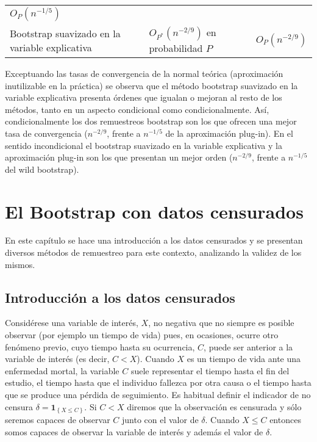 \documentclass[
]{book}
\theoremstyle{definition}
\theoremstyle{definition}
\theoremstyle{definition}
\theoremstyle{remark}
\begin{document}
\begin{longtable}[]{@{}lll@{}}
\begin{minipage}[t]{0.29\columnwidth}
\(O_{P}\left(n^{-1/5}\right)\)\strut
\end{minipage}\tabularnewline
\begin{minipage}[t]{0.25\columnwidth}\raggedright
Bootstrap suavizado
en la variable
explicativa\strut
\end{minipage} & \begin{minipage}[t]{0.37\columnwidth}\raggedright
\(O_{P^{\ast}}\left( n^{-2/9}\right)\)
en probabilidad \(P\)\strut
\end{minipage} & \begin{minipage}[t]{0.29\columnwidth}\raggedright
\(O_{P}\left(n^{-2/9}\right)\)\strut
\end{minipage}\tabularnewline
\bottomrule
\end{longtable}

Exceptuando las tasas de convergencia de la normal teórica (aproximación
inutilizable en la práctica) se observa que el método bootstrap
suavizado en la variable explicativa presenta órdenes que igualan o
mejoran al resto de los métodos, tanto en un aspecto condicional como
condicionalmente. Así, condicionalmente los dos remuestreos bootstrap
son los que ofrecen una mejor tasa de convergencia (\(n^{-2/9}\),
frente a \(n^{-1/5}\) de la aproximación plug-in). En el
sentido incondicional el bootstrap suavizado en la variable explicativa
y la aproximación plug-in son los que presentan un mejor orden
(\(n^{-2/9}\), frente a \(n^{-1/5}\) del wild bootstrap).

\hypertarget{cap8}{%
\chapter{El Bootstrap con datos censurados}\label{cap8}}

En este capítulo se hace una introducción a los datos censurados y se
presentan diversos métodos de remuestreo para este contexto, analizando
la validez de los mismos.

\hypertarget{introducciuxf3n-a-los-datos-censurados}{%
\section{Introducción a los datos censurados}\label{introducciuxf3n-a-los-datos-censurados}}

Considérese una variable de interés, \(X\), no negativa que no siempre es
posible observar (por ejemplo un tiempo de vida) pues, en ocasiones,
ocurre otro fenómeno previo, cuyo tiempo hasta su ocurrencia, \(C\), puede
ser anterior a la variable de interés (es decir, \(C<X\)). Cuando \(X\) es
un tiempo de vida ante una enfermedad mortal, la variable \(C\) suele
representar el tiempo hasta el fin del estudio, el tiempo hasta que el
individuo fallezca por otra causa o el tiempo hasta que se produce una
pérdida de seguimiento. Es habitual definir el indicador de no censura
\(\delta =\mathbf{1}_{\left\{ X\leq C\right\} }\). Si \(C<X\) diremos que la
observación es censurada y sólo seremos capaces de observar \(C\) junto
con el valor de \(\delta\). Cuando \(X\leq C\) entonces somos capaces de
observar la variable de interés y además el valor de \(\delta\).
\end{document}
